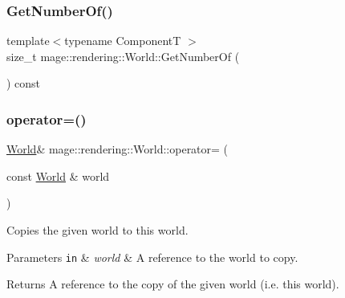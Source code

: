 \mbox{\label{classmage_1_1rendering_1_1_world_a3f5ff2ff451a90af7071bddf9d226618}} 
\subsubsection{\texorpdfstring{Get\+Number\+Of()}{GetNumberOf()}}
{\footnotesize\ttfamily template$<$typename ComponentT $>$ \\
size\+\_\+t mage\+::rendering\+::\+World\+::\+Get\+Number\+Of (\begin{DoxyParamCaption}{ }\end{DoxyParamCaption}) const\hspace{0.3cm}{\ttfamily [noexcept]}}

\mbox{\label{classmage_1_1rendering_1_1_world_aff83cf89dc28c141ca7b7a0cbc28e2ae}} 
\subsubsection{\texorpdfstring{operator=()}{operator=()}\hspace{0.1cm}{\footnotesize\ttfamily [1/2]}}
{\footnotesize\ttfamily \mbox{\hyperlink{classmage_1_1rendering_1_1_world}{World}}\& mage\+::rendering\+::\+World\+::operator= (\begin{DoxyParamCaption}\item[{const \mbox{\hyperlink{classmage_1_1rendering_1_1_world}{World}} \&}]{world }\end{DoxyParamCaption})\hspace{0.3cm}{\ttfamily [delete]}}

Copies the given world to this world.


\begin{DoxyParams}[1]{Parameters}
\mbox{\tt in}  & {\em world} & A reference to the world to copy. \\
\hline
\end{DoxyParams}
\begin{DoxyReturn}{Returns}
A reference to the copy of the given world (i.\+e. this world). 
\end{DoxyReturn}
\mbox{\label{classmage_1_1rendering_1_1_world_a7f44f10905070997553a7c7ad90ddcb2}} 
